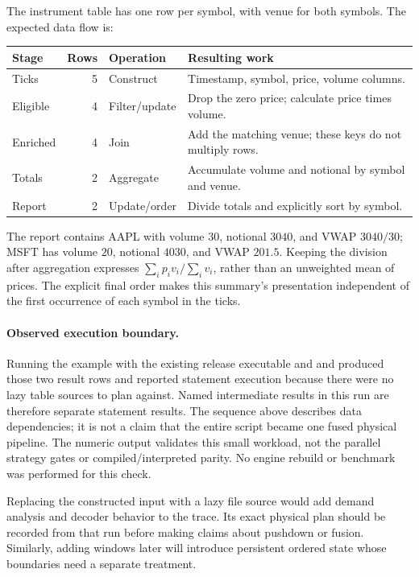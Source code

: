 The instrument table has one row per symbol, with venue  for both
symbols. The expected data flow is:
\begin{center}
\begin{tabularx}{\linewidth}{@{}lrlX@{}}
\toprule
Stage & Rows & Operation & Resulting work\\
\midrule
Ticks & 5 & Construct & Timestamp, symbol, price, volume columns.\\
Eligible & 4 & Filter/update & Drop the zero price; calculate price times volume.\\
Enriched & 4 & Join & Add the matching venue; these keys do not multiply rows.\\
Totals & 2 & Aggregate & Accumulate volume and notional by symbol and venue.\\
Report & 2 & Update/order & Divide totals and explicitly sort by symbol.\\
\bottomrule
\end{tabularx}
\end{center}
The report contains AAPL with volume $30$, notional $3040$, and VWAP
$3040/30$; MSFT has volume $20$, notional $4030$, and VWAP $201.5$.
Keeping the division after aggregation expresses
$\sum_i p_i v_i / \sum_i v_i$, rather than an unweighted mean of prices.
The explicit final order makes this summary's presentation independent of
the first occurrence of each symbol in the ticks.

\paragraph{Observed execution boundary.}
Running the example with the existing release executable and
 and  produced those two result rows and
reported statement execution because there were no lazy table sources to plan
against. Named intermediate results in this run are therefore separate
statement results. The sequence above describes data dependencies; it is
not a claim that the entire script became one fused physical pipeline.
The numeric output validates this small workload, not the parallel strategy
gates or compiled/interpreted parity. No engine rebuild or benchmark was
performed for this check.

Replacing the constructed input with a lazy file source would add demand
analysis and decoder behavior to the trace. Its exact physical plan should
be recorded from that run before making claims about pushdown or fusion.
Similarly, adding windows later will introduce persistent ordered state whose
boundaries need a separate treatment.

